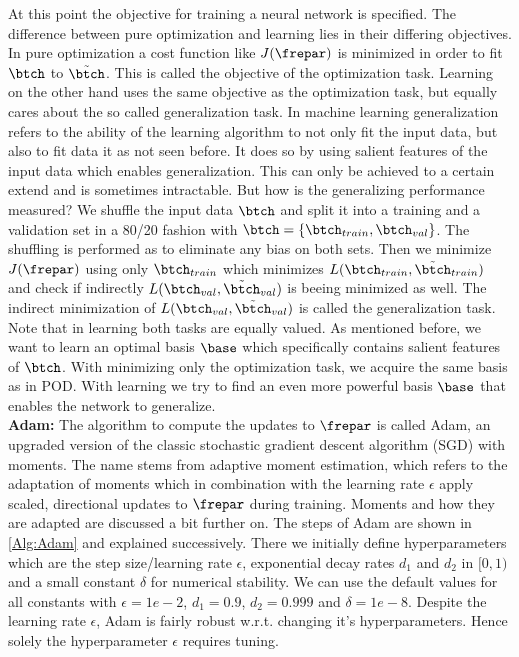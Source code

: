 At this point the objective for training a neural network is specified. The difference between pure optimization and learning lies in their differing objectives. In pure optimization a cost function like \(J(\frepar)\) is minimized in order to fit \(\btch\) to \(\tilde{\btch}\). This is called the objective of the optimization task. Learning on the other hand uses the same objective as the optimization task, but equally cares about the so called generalization task. In machine learning generalization refers to the ability of the learning algorithm to not only fit the input data, but also to fit data it as not seen before. It does so by using salient features of the input data which enables generalization. This can only be achieved to a certain extend and is sometimes intractable. But how is the generalizing performance measured? We shuffle the input data \(\btch\) and split it into a training and a validation set in a 80/20 fashion with \(\btch=\{\btch_{train},\btch_{val}\}\). The shuffling is performed as to eliminate any bias on both sets. Then we minimize \(J(\frepar)\) using only \(\btch_{train}\) which minimizes \(L(\btch_{train},\tilde{\btch}_{train})\) and check if indirectly \(L(\btch_{val},\tilde{\btch}_{val})\) is beeing minimized as well. The indirect minimization of \(L(\btch_{val},\tilde{\btch}_{val})\) is called the generalization task. Note that in learning both tasks are equally valued. As mentioned before, we want to learn an optimal basis \(\base\) which specifically contains salient features of \(\btch\). With minimizing only the optimization task, we acquire the same basis as in POD. With learning we try to find an even more powerful basis \(\base\) that enables the network to generalize.\\ 
\textbf{Adam:}
The algorithm to compute the updates to \(\frepar\) is called Adam, an upgraded version of the classic stochastic gradient descent algorithm (SGD) with moments. The name stems from adaptive moment estimation, which refers to the adaptation of moments which in combination with the learning rate \(\epsilon\) apply scaled, directional updates to \(\frepar\) during training. Moments and how they are adapted are discussed a bit further on. The steps of Adam are shown in \cref{Alg:Adam} and explained successively. There we initially define hyperparameters which are the step size/learning rate \(\epsilon\), exponential decay rates \(d_1\) and \(d_2\) in \([0,1)\) and a small constant \(\delta\) for numerical stability. We can use the default values for all constants with \(\epsilon=1e-2\), \(d_1=0.9\), \(d_2=0.999\) and \(\delta=1e-8\).  Despite the learning rate \(\epsilon\), Adam is fairly robust w.r.t. changing it's hyperparameters. Hence solely the hyperparameter \(\epsilon\) requires tuning.
